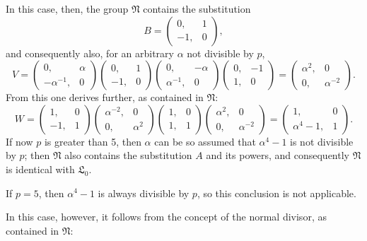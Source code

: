 In this case, then, the group $\mathfrak{N}$ contains the substitution
\[
B = \begin{pmatrix} 0, & 1 \\ -1, & 0 \end{pmatrix},
\]
and consequently also, for an arbitrary $\alpha$ not divisible by $p$,
\[
V = \begin{pmatrix} 0, & \alpha \\ -\alpha^{-1}, & 0 \end{pmatrix}\begin{pmatrix} 0, & 1 \\ -1, & 0 \end{pmatrix}\begin{pmatrix} 0, & -\alpha \\ \alpha^{-1}, & 0 \end{pmatrix}\begin{pmatrix} 0, & -1 \\ 1, & 0 \end{pmatrix} = \begin{pmatrix} \alpha^2, & 0 \\ 0, & \alpha^{-2} \end{pmatrix}.
\]
From this one derives further, as contained in $\mathfrak{N}$:
\[
W = \begin{pmatrix} 1, & 0 \\ -1, & 1 \end{pmatrix}\begin{pmatrix} \alpha^{-2}, & 0 \\ 0, & \alpha^2 \end{pmatrix}\begin{pmatrix} 1, & 0 \\ 1, & 1 \end{pmatrix}\begin{pmatrix} \alpha^2, & 0 \\ 0, & \alpha^{-2} \end{pmatrix} = \begin{pmatrix} 1, & 0 \\ \alpha^4-1, & 1 \end{pmatrix}.
\]
If now $p$ is greater than 5, then $\alpha$ can be so assumed that $\alpha^4 - 1$ is not divisible by $p$; then $\mathfrak{N}$ also contains the substitution $A$ and its powers, and consequently $\mathfrak{N}$ is identical with $\mathfrak{L}_0$.

If $p = 5$, then $\alpha^4 - 1$ is always divisible by $p$, so this conclusion is not applicable.

In this case, however, it follows from the concept of the normal divisor, as contained in $\mathfrak{N}$:

